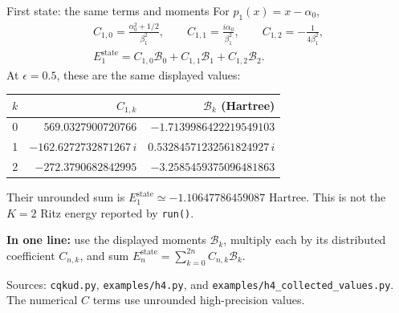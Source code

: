 \documentclass[10pt,letterpaper]{article}
\newcommand{\Bcal}{\mathcal B}
\begin{document}
\begin{navybox}{First state: the same terms and moments}
For \(p_1(x)=x-\alpha_0\),
\begin{equation}
 \begin{gathered}
 C_{1,0}=\frac{\alpha_0^2+1/2}{\beta_1^2},\qquad
 C_{1,1}=\frac{i\alpha_0}{\beta_1^2},\qquad
 C_{1,2}=-\frac{1}{4\beta_1^2},\\
 E_1^{\mathrm{state}}=C_{1,0}\Bcal_0+C_{1,1}\Bcal_1+C_{1,2}\Bcal_2.
 \end{gathered}
 \label{eq:first}
\end{equation}
At \(\epsilon=0.5\), these are the same displayed values:
\begin{center}
\small
\begin{tabular}{c@{\qquad}r@{\qquad}r}
\(k\) & \(C_{1,k}\) & \(\Bcal_k\) (Hartree)\\
\hline
0 & \(569.0327900720766\) & \(-1.7139986422219549103\)\\
1 & \(-162.6272732871267\,i\) & \(0.53284571232561824927\,i\)\\
2 & \(-272.3790682842995\) & \(-3.2585459375096481863\)
\end{tabular}
\end{center}
Their unrounded sum is \(E_1^{\mathrm{state}}\simeq-1.10647786459087\)
Hartree.  This is not the \(K=2\) Ritz energy reported by \texttt{run()}.
\end{navybox}

\begin{purposebox}
\textbf{In one line:} use the displayed moments \(\Bcal_k\),
multiply each by its distributed coefficient \(C_{n,k}\), and sum
\(E_n^{\mathrm{state}}=\sum_{k=0}^{2n}C_{n,k}\Bcal_k\).
\end{purposebox}

\vfill
{\footnotesize\color{guideNavy}
Sources: \texttt{cqkud.py}, \texttt{examples/h4.py}, and
\texttt{examples/h4\_collected\_values.py}.
The numerical $C$ terms use unrounded high-precision values.}
\end{document}
